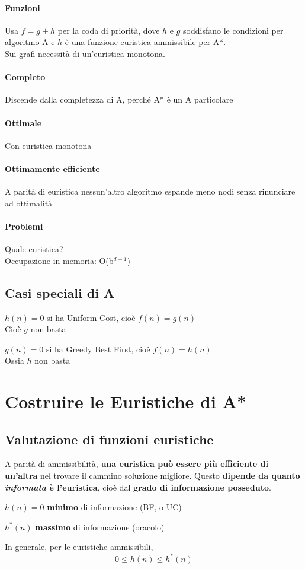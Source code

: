 \documentclass[10pt]{book}
\begin{document}
\paragraph{Funzioni} Usa $f = g + h$ per la coda di priorità, dove $h$ e $g$ soddisfano le condizioni per algoritmo A e $h$ è una funzione euristica ammissibile per A*.\\
Sui grafi necessità di un'euristica monotona.
\paragraph{Completo} Discende dalla completezza di A, perché A* è un A particolare
\paragraph{Ottimale} Con euristica monotona
\paragraph{Ottimamente efficiente} A parità di euristica nessun'altro algoritmo espande meno nodi senza rinunciare ad ottimalità
\paragraph{Problemi} Quale euristica?\\
Occupazione in memoria: O(b$^{d+1}$)
\subsection{Casi speciali di A}
\begin{list}{}{}
	\item $h(n) = 0$ si ha Uniform Cost, cioè $f(n) = g(n)$\\
	Cioè $g$ non basta
	\item $g(n) = 0$ si ha Greedy Best First, cioè $f(n) = h(n)$\\
	Ossia $h$ non basta
\end{list}
\pagebreak
\section{Costruire le Euristiche di A*}
\subsection{Valutazione di funzioni euristiche}
A parità di ammissibilità, \textbf{una euristica può essere più efficiente di un'altra} nel trovare il cammino soluzione migliore. Questo \textbf{dipende da quanto \textit{informata} è l'euristica}, cioè dal \textbf{grado di informazione posseduto}.
\begin{list}{}{}
	\item $h(n) = 0$ \textbf{minimo} di informazione (BF, o UC)
	\item $h^*(n)$ \textbf{massimo} di informazione (oracolo)
\end{list}
In generale, per le euristiche ammissibili, $$0 \leq h(n) \leq h^*(n)$$
\end{document}
